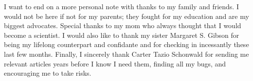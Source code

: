 I want to end on a more personal note with thanks to my family and friends. I would not be here if not for my parents; they fought for my education and are my biggest advocates. Special thanks to my mom who always thought that I would become a scientist. I would also like to thank my sister Margaret S. Gibson for being my lifelong counterpart and confidante and for checking in incessantly these last few months. Finally, I sincerely thank Carter Tazio Schonwald for sending me relevant articles years before I know I need them, finding all my bugs, and encouraging me to take risks.

